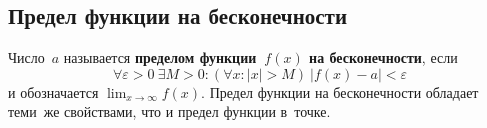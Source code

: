 \subsection{Предел функции на бесконечности}
Число~$a$ называется \textbf{пределом функции~$f(x)$ на бесконечности}, если
\begin{equation*}
\forall \varepsilon > 0 \ \exists M > 0 \colon (\forall x \colon |x| > M) \ |f(x) - a| < \varepsilon
\end{equation*}
и обозначается $\displaystyle \lim_{x \to \infty} f(x)$.
Предел функции на бесконечности обладает теми~же свойствами, что и предел функции в~точке.